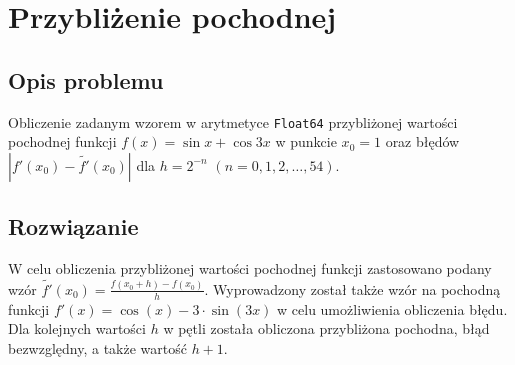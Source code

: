 \documentclass[11pt,a4paper]{article}
\begin{document}
\section{Przybliżenie pochodnej}
\subsection{Opis problemu}
Obliczenie zadanym wzorem w arytmetyce \texttt{Float64} przybliżonej wartości pochodnej funkcji $f(x)=\sin{x}+\cos{3x}$ w punkcie $x_0=1$ oraz błędów $|f'(x_0)-\tilde{f'}(x_0)|$ dla $h=2^{-n}$ $(n=0,1,2,\dots,54)$.
\subsection{Rozwiązanie}
W celu obliczenia przybliżonej wartości pochodnej funkcji zastosowano podany wzór $\tilde{f'}(x_0)=\frac{f(x_0 + h)-f(x_0)}{h}$. Wyprowadzony został także wzór na pochodną funkcji $f'(x)=\cos({x})-3\cdot \sin({3x})$ w celu umożliwienia obliczenia błędu. Dla kolejnych wartości $h$ w pętli została obliczona przybliżona pochodna, błąd bezwzględny, a także wartość $h+1$.
\end{document}

